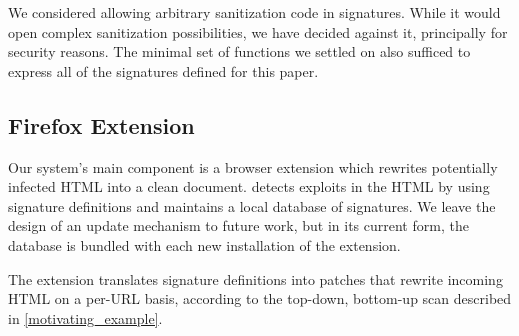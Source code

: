 We considered allowing arbitrary sanitization code in
signatures. While it would open complex sanitization possibilities, we
have decided against it, principally for security reasons. The minimal
set of functions we settled on also sufficed to express all of the
signatures defined for this paper.


 \subsection{Firefox Extension} \label{firefox_extension}

 Our system's main component is a browser extension which rewrites
 potentially infected HTML into a clean document.
 detects exploits in the HTML by using signature definitions and
 maintains a local database of signatures. We leave the design of an
 update mechanism to future work, but in its current form, the
 database is bundled with each new installation of the extension.

 The extension translates signature definitions into patches that
 rewrite incoming HTML on a per-URL basis, according to the top-down,
 bottom-up scan described in \autoref{motivating_example}.

